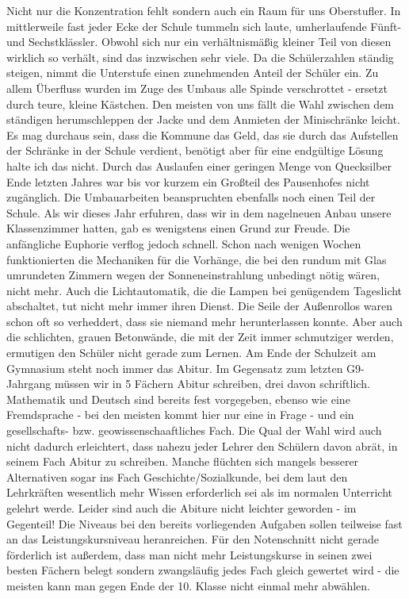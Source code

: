 \documentclass[a4paper,12pt,oneside]{scrbook}
\begin{document}
Nicht nur die Konzentration fehlt sondern auch ein Raum für uns Oberstufler. In mittlerweile fast jeder Ecke der Schule tummeln sich laute, umherlaufende Fünft- und Sechstklässler. Obwohl sich nur ein verhältnismäßig kleiner Teil von diesen wirklich so verhält, sind das inzwischen sehr viele. Da die Schülerzahlen ständig steigen, nimmt die Unterstufe einen zunehmenden Anteil der Schüler ein.
Zu allem Überfluss wurden im Zuge des Umbaus alle Spinde verschrottet - ersetzt durch teure, kleine Kästchen. Den meisten von uns fällt die Wahl zwischen dem ständigen herumschleppen der Jacke und dem Anmieten der Minischränke leicht. Es mag durchaus sein, dass die Kommune das Geld, das sie durch das Aufstellen der Schränke in der Schule verdient, benötigt aber für eine endgültige Lösung halte ich das nicht. Durch das Auslaufen einer geringen Menge von Quecksilber Ende letzten Jahres war bis vor kurzem ein Großteil des Pausenhofes nicht zugänglich. Die Umbauarbeiten beanspruchten ebenfalls noch einen Teil der Schule. Als wir dieses Jahr erfuhren, dass wir in dem nagelneuen Anbau unsere Klassenzimmer hatten, gab es wenigstens einen Grund zur Freude. Die anfängliche Euphorie verflog jedoch schnell. Schon nach wenigen Wochen funktionierten die Mechaniken für die Vorhänge, die bei den rundum mit Glas umrundeten Zimmern wegen der Sonneneinstrahlung unbedingt nötig wären, nicht mehr. Auch die Lichtautomatik, die die Lampen bei genügendem Tageslicht abschaltet, tut nicht mehr immer ihren Dienst. Die Seile der Außenrollos waren schon oft so verheddert, dass sie niemand mehr herunterlassen konnte. Aber auch die schlichten, grauen Betonwände, die mit der Zeit immer schmutziger werden, ermutigen den Schüler nicht gerade zum Lernen.
Am Ende der Schulzeit am Gymnasium steht noch immer das Abitur. Im Gegensatz zum letzten G9-Jahrgang müssen wir in 5 Fächern Abitur schreiben, drei davon schriftlich. Mathematik und Deutsch sind bereits fest vorgegeben, ebenso wie eine Fremdsprache - bei den meisten kommt hier nur eine in Frage - und ein gesellschafts- bzw. geowissenschaaftliches Fach. Die Qual der Wahl wird auch nicht dadurch erleichtert, dass nahezu jeder Lehrer den Schülern davon abrät, in seinem Fach Abitur zu schreiben. Manche flüchten sich mangels besserer Alternativen sogar ins Fach Geschichte/Sozialkunde, bei dem laut den Lehrkräften wesentlich mehr Wissen erforderlich sei als im normalen Unterricht gelehrt werde. Leider sind auch die Abiture nicht leichter geworden - im Gegenteil! Die Niveaus bei den bereits vorliegenden Aufgaben sollen teilweise fast an das Leistungskursniveau heranreichen. Für den Notenschnitt nicht gerade förderlich ist außerdem, dass man nicht mehr Leistungskurse in seinen zwei besten Fächern belegt sondern zwangsläufig jedes Fach gleich gewertet wird - die meisten kann man gegen Ende der 10. Klasse nicht einmal mehr abwählen.
\end{document}
